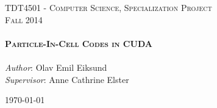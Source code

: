 \begin{titlepage}
\begin{center}
\textsc{\LARGE TDT4501 - Computer Science, Specialization Project}\\[0.5 cm]

\textsc{\Large Fall 2014} \\[3cm]

\HRule \\[0.5cm]
\textsc{\huge \bfseries Particle-In-Cell Codes in CUDA}\\[0.5cm]
\HRule \\[1.5cm]

\large \emph{Author}: Olav Emil Eiksund\\[0.5cm]
\large \emph{Supervisor}: Anne Cathrine Elster

\vfill
{\large \today}
\end{center}
\end{titlepage}